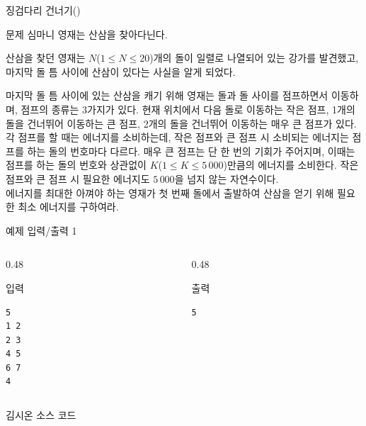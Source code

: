 ﻿

\begin{frame}[label=p2]{징검다리 건너기(\prob)}
\small

\begin{block}{문제}
심마니 영재는 산삼을 찾아다닌다.

산삼을 찾던 영재는 $N$($1 \le N \le 20$)개의 돌이 일렬로 나열되어 있는 강가를 발견했고, 마지막 돌 틈 사이에 산삼이 있다는 사실을 알게 되었다.

마지막 돌 틈 사이에 있는 산삼을 캐기 위해 영재는 돌과 돌 사이를 점프하면서 이동하며, 점프의 종류는 3가지가 있다. 현재 위치에서 다음 돌로 이동하는 작은 점프, 1개의 돌을 건너뛰어 이동하는 큰 점프, 2개의 돌을 건너뛰어 이동하는 매우 큰 점프가 있다. \\

각 점프를 할 때는 에너지를 소비하는데, 작은 점프와 큰 점프 시 소비되는 에너지는 점프를 하는 돌의 번호마다 다르다. 매우 큰 점프는 단 한 번의 기회가 주어지며, 이때는 점프를 하는 돌의 번호와 상관없이 $K$($1 \le K \le 5\,000$)만큼의 에너지를 소비한다. 작은 점프와 큰 점프 시 필요한 에너지도 $5\,000$을 넘지 않는 자연수이다. \\

에너지를 최대한 아껴야 하는 영재가 첫 번째 돌에서 출발하여 산삼을 얻기 위해 필요한 최소 에너지를 구하여라.
\end{block}
\end{frame}

\begin{frame}[fragile]{예제 입력/출력 1}
\begin{columns}[T]
\begin{column}{0.48\textwidth}
\begin{block}{입력}
\begin{verbatim}
5
1 2
2 3
4 5
6 7
4
\end{verbatim}
\end{block}
\end{column}
\begin{column}{0.48\textwidth}
\begin{block}{출력}
\begin{verbatim}
5
\end{verbatim}
\end{block}
\end{column}
\end{columns}
\end{frame}

\begin{frame}{김시온 소스 코드}
\inputminted{java}{../src/\prob/sion/Main.java}
\end{frame}

